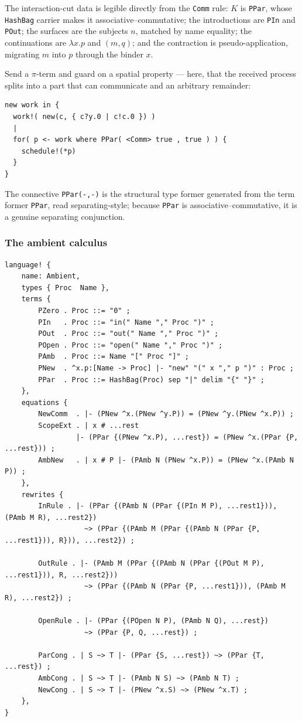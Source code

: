 \documentclass[11pt]{article}
\theoremstyle{definition}
\theoremstyle{plain}
\theoremstyle{remark}
\begin{document}
The interaction-cut data is legible directly from the \texttt{Comm} rule: $K$ is
\texttt{PPar}, whose \texttt{HashBag} carrier makes it associative--commutative; the
introductions are \texttt{PIn} and \texttt{POut}; the surfaces are the subjects $n$,
matched by name equality; the continuations are $\lambda x.p$ and $(m,q)$; and the
contraction is pseudo-application, migrating $m$ into $p$ through the binder $x$.

Send a $\pi$-term and guard on a spatial property --- here, that the received process
splits into a part that can communicate and an arbitrary remainder:

\begin{lstlisting}
new work in {
  work!( new(c, { c?y.0 | c!c.0 }) )
  |
  for( p <- work where PPar( <Comm> true , true ) ) {
    schedule!(*p)
  }
}
\end{lstlisting}

The connective \texttt{PPar(-,-)} is the structural type former generated from the term
former \texttt{PPar}, read separating-style; because \texttt{PPar} is
associative--commutative, it is a genuine separating conjunction.

\subsubsection{The ambient calculus}

\begin{lstlisting}
language! {
    name: Ambient,
    types { Proc  Name },
    terms {
        PZero . Proc ::= "0" ;
        PIn   . Proc ::= "in(" Name "," Proc ")" ;
        POut  . Proc ::= "out(" Name "," Proc ")" ;
        POpen . Proc ::= "open(" Name "," Proc ")" ;
        PAmb  . Proc ::= Name "[" Proc "]" ;
        PNew  . ^x.p:[Name -> Proc] |- "new" "(" x "," p ")" : Proc ;
        PPar  . Proc ::= HashBag(Proc) sep "|" delim "{" "}" ;
    },
    equations {
        NewComm  . |- (PNew ^x.(PNew ^y.P)) = (PNew ^y.(PNew ^x.P)) ;
        ScopeExt . | x # ...rest
                 |- (PPar {(PNew ^x.P), ...rest}) = (PNew ^x.(PPar {P, ...rest})) ;
        AmbNew   . | x # P |- (PAmb N (PNew ^x.P)) = (PNew ^x.(PAmb N P)) ;
    },
    rewrites {
        InRule . |- (PPar {(PAmb N (PPar {(PIn M P), ...rest1})), (PAmb M R), ...rest2})
                   ~> (PPar {(PAmb M (PPar {(PAmb N (PPar {P, ...rest1})), R})), ...rest2}) ;

        OutRule . |- (PAmb M (PPar {(PAmb N (PPar {(POut M P), ...rest1})), R, ...rest2}))
                   ~> (PPar {(PAmb N (PPar {P, ...rest1})), (PAmb M R), ...rest2}) ;

        OpenRule . |- (PPar {(POpen N P), (PAmb N Q), ...rest})
                   ~> (PPar {P, Q, ...rest}) ;

        ParCong . | S ~> T |- (PPar {S, ...rest}) ~> (PPar {T, ...rest}) ;
        AmbCong . | S ~> T |- (PAmb N S) ~> (PAmb N T) ;
        NewCong . | S ~> T |- (PNew ^x.S) ~> (PNew ^x.T) ;
    },
}
\end{lstlisting}
\end{document}
